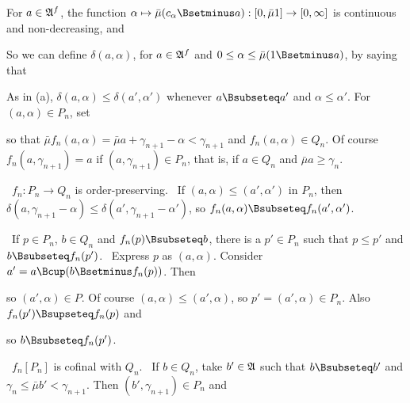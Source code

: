 {For $a\in\frak A^f$, the function
$\alpha\mapsto\bar\mu(c_{\alpha}\Bsetminus a):[0,\bar\mu 1]\to[0,\infty]$
is continuous and non-decreasing, and


\noindent So we can define $\delta(a,\alpha)$, for
$a\in\frak A^f$ and $0\le\alpha\le\bar\mu(1\Bsetminus a)$, by saying that


\noindent As in (a), $\delta(a,\alpha)\le\delta(a',\alpha')$ whenever
$a\Bsubseteq a'$ and $\alpha\le\alpha'$.    For $(a,\alpha)\in P_n$, set


\noindent so that
$\bar\mu f_n(a,\alpha)=\bar\mu a+\gamma_{n+1}-\alpha<\gamma_{n+1}$ and
$f_n(a,\alpha)\in Q_n$.   Of course $f_n(a,\gamma_{n+1})=a$ if
$(a,\gamma_{n+1})\in P_n$, that is, if $a\in Q_n$ and
$\bar\mu a\ge\gamma_n$.

\medskip

\grheada\ $f_n:P_n\to Q_n$ is order-preserving.   \Prf\ If
$(a,\alpha)\le(a',\alpha')$ in $P_n$, then
$\delta(a,\gamma_{n+1}-\alpha)\le\delta(a',\gamma_{n+1}-\alpha')$, so
$f_n(a,\alpha)\Bsubseteq f_n(a',\alpha')$.\ \Qed

\medskip

\qquad\grheadb\ If $p\in P_n$, $b\in Q_n$ and $f_n(p)\Bsubseteq b$,
there is a
$p'\in P_n$ such that $p\le p'$ and $b\Bsubseteq f_n(p')$.   \Prf\
Express $p$ as $(a,\alpha)$.   Consider
$a'=a\Bcup(b\Bsetminus f_n(p))$.   Then


\noindent so $(a',\alpha)\in P$.   Of course
$(a,\alpha)\le(a',\alpha)$, so $p'=(a',\alpha)\in P_n$.   Also
$f_n(p')\Bsupseteq f_n(p)$ and


\noindent so $b\Bsubseteq f_n(p')$.\ \Qed

\medskip

\qquad\grheadc\ $f_n[P_n]$ is cofinal with $Q_n$.   \Prf\ If
$b\in Q_n$, take $b'\in\frak A$ such that $b\Bsubseteq b'$ and
$\gamma_n\le\bar\mu b'<\gamma_{n+1}$.   Then $(b',\gamma_{n+1})\in P_n$
and

}
